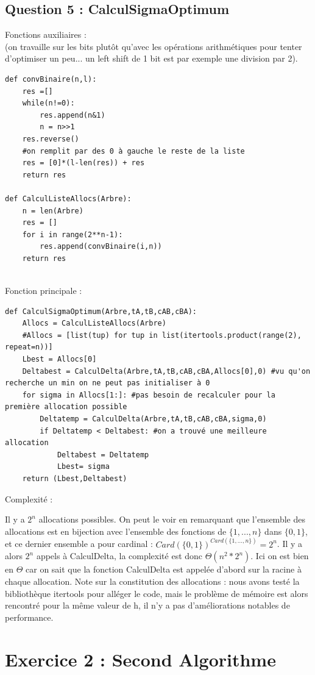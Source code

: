 \documentclass{article}
\begin{document}
\subsection{Question 5 : CalculSigmaOptimum}
Fonctions auxiliaires :\\
(on travaille sur les bits plutôt qu'avec les opérations arithmétiques pour tenter d'optimiser un peu... un left shift de 1 bit est par exemple une division par 2).
\begin{lstlisting}
def convBinaire(n,l):
    res =[]
    while(n!=0):
        res.append(n&1)
        n = n>>1
    res.reverse()
    #on remplit par des 0 à gauche le reste de la liste
    res = [0]*(l-len(res)) + res
    return res
    
def CalculListeAllocs(Arbre):
    n = len(Arbre)
    res = []
    for i in range(2**n-1):
        res.append(convBinaire(i,n))
    return res
    
\end{lstlisting}
Fonction principale :
\begin{lstlisting}
def CalculSigmaOptimum(Arbre,tA,tB,cAB,cBA):
    Allocs = CalculListeAllocs(Arbre)
    #Allocs = [list(tup) for tup in list(itertools.product(range(2), repeat=n))]
    Lbest = Allocs[0]
    Deltabest = CalculDelta(Arbre,tA,tB,cAB,cBA,Allocs[0],0) #vu qu'on recherche un min on ne peut pas initialiser à 0
    for sigma in Allocs[1:]: #pas besoin de recalculer pour la première allocation possible
        Deltatemp = CalculDelta(Arbre,tA,tB,cAB,cBA,sigma,0)
        if Deltatemp < Deltabest: #on a trouvé une meilleure allocation
            Deltabest = Deltatemp
            Lbest= sigma
    return (Lbest,Deltabest)
\end{lstlisting}

Complexité : 

Il y a $2^n$ allocations possibles. On peut le voir en remarquant que l'ensemble des allocations est en bijection avec l'ensemble des fonctions de $\{1,...,n\}$ dans $\{0,1\}$, et ce dernier ensemble a pour cardinal : $Card(\{0,1\})^{Card(\{1,...,n\})}=2^n$.
Il y a alors $2^n$ appels à CalculDelta, la complexité est donc $\Theta(n^2*2^n)$. Ici on est bien en $\Theta$ car on sait que la fonction CalculDelta est appelée d'abord sur la racine à chaque allocation. 
Note sur la constitution des allocations : nous avons testé la bibliothèque itertools pour alléger le code, mais le problème de mémoire est alors rencontré pour la même valeur de h, il n'y a pas d'améliorations notables de performance.


\section{Exercice 2 : Second Algorithme}
\end{document}

